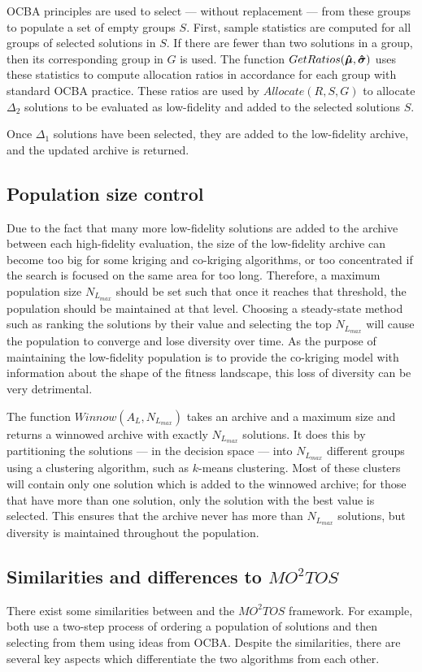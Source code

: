 \documentclass[journal]{IEEEtran}
\begin{document}
OCBA principles are used to select --- without replacement --- from these groups to populate a set of empty groups $S$. First, sample statistics are computed for all groups of selected solutions in $S$. If there are fewer than two solutions in a group, then its corresponding group in $G$ is used. The function $GetRatios(\boldsymbol{\hat{\mu}},\boldsymbol{\hat{\sigma}})$ uses these statistics to compute allocation ratios in accordance for each group with standard OCBA practice. These ratios are used by $Allocate(R,S,G)$ to allocate $\Delta_2$ solutions to be evaluated as low-fidelity and added to the selected solutions $S$.

Once $\Delta_1$ solutions have been selected, they are added to the low-fidelity archive, and the updated archive is returned.

\subsection{Population size control}
Due to the fact that many more low-fidelity solutions are added to the archive between each high-fidelity evaluation, the size of the low-fidelity archive can become too big for some kriging and co-kriging algorithms, or too concentrated if the search is focused on the same area for too long. Therefore, a maximum population size $N_{L_{max}}$ should be set such that once it reaches that threshold, the population should be maintained at that level. Choosing a steady-state method such as ranking the solutions by their value and selecting the top $N_{L_{max}}$ will cause the population to converge and lose diversity over time. As the purpose of maintaining the low-fidelity population is to provide the co-kriging model with information about the shape of the fitness landscape, this loss of diversity can be very detrimental. 

The function $Winnow(A_L,N_{L_{max}})$ takes an archive and a maximum size and returns a winnowed archive with exactly $N_{L_{max}}$ solutions. It does this by partitioning the solutions --- in the decision space --- into $N_{L_{max}}$ different groups using a clustering algorithm, such as $k$-means clustering. Most of these clusters will contain only one solution which is added to the winnowed archive; for those that have more than one solution, only the solution with the best value is selected. This ensures that the archive never has more than $N_{L_{max}}$ solutions, but diversity is maintained throughout the population.

\subsection{Similarities and differences to $MO^2TOS$}
There exist some similarities between \AlgName{} and the $MO^2TOS$ framework. For example, both use a two-step process of ordering a population of solutions and then selecting from them using ideas from OCBA. Despite the similarities, there are several key aspects which differentiate the two algorithms from each other. 
\end{document}
